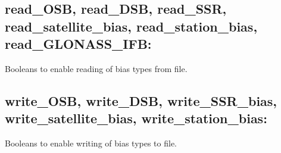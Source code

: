 \subsection*{read\_OSB, read\_DSB, read\_SSR, read\_satellite\_bias, read\_station\_bias, read\_GLONASS\_IFB:}

Booleans to enable reading of bias types from file.


\subsection*{write\_OSB, write\_DSB, write\_SSR\_bias, write\_satellite\_bias, write\_station\_bias:}

Booleans to enable writing of bias types to file.




